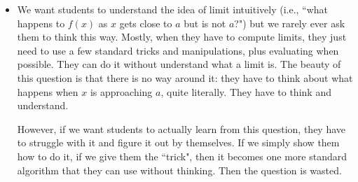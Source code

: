 \documentclass[11pt]{article}
\newcommand{\nl}{\hfill \vspace{-1.1\baselineskip}} %
\begin{document}
\begin{comments}
\nl
	\begin{itemize}
		\item We want students to understand the idea of limit intuitively (i.e., ``what happens to $f(x)$ as $x$ gets close to $a$ but is not $a$?")  but we rarely ever ask them to think this way.  Mostly, when they have to compute limits, they just need to use a few standard tricks and manipulations, plus evaluating when possible.  They can do it without understand what a limit is.  The beauty of this question is that there is no way around it: they have to think about what happens when $x$ is approaching $a$, quite literally.    They have to think and understand.

		However, if we want students to actually learn from this question, they have to struggle with it and figure it out by themselves.  If we simply show them how to do it, if we give them the ``trick", then it becomes one more standard algorithm that they can use without thinking.   Then the question is wasted.


\end{itemize}
\end{comments}
\end{document}
